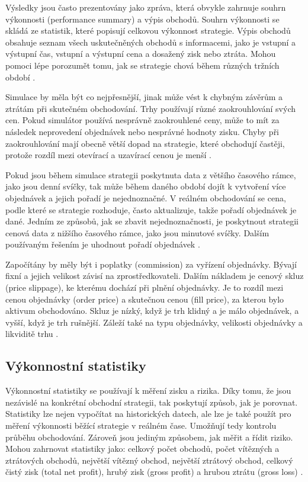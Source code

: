 Výsledky jsou často prezentovány jako zpráva, která obvykle zahrnuje souhrn výkonnosti (performance summary) a výpis obchodů.
Souhrn výkonnosti se skládá ze statistik, které popisují celkovou výkonnost strategie.
Výpis obchodů obsahuje seznam všech uskutečněných obchodů s informacemi, jako je vstupní a výstupní čas, vstupní a výstupní cena a dosažený zisk nebo ztráta.
Mohou pomoci lépe porozumět tomu, jak se strategie chová během různých tržních období \cite{pardo}.

Simulace by měla být co nejpřesnější, jinak může vést k chybným závěrům a ztrátám při skutečném obchodování.
Trhy používají různé zaokrouhlování svých cen. Pokud simulátor používá nesprávně zaokrouhlené ceny, může to mít za následek neprovedení objednávek nebo nesprávné hodnoty zisku.
Chyby při zaokrouhlování mají obecně větší dopad na strategie, které obchodují častěji, protože rozdíl mezi otevírací a uzavírací cenou je menší \cite{pardo}.

Pokud jsou během simulace strategii poskytnuta data z většího časového rámce, jako jsou denní svíčky, tak může během daného období dojít k vytvoření více objednávek a jejich pořadí je nejednoznačné.
V reálném obchodování se cena, podle které se strategie rozhoduje, často aktualizuje, takže pořadí objednávek je dané.
Jedním ze způsobů, jak se zbavit nejednoznačnosti, je poskytnout strategii cenová data z nižšího časového rámce, jako jsou minutové svíčky.
Dalším používaným řešením je uhodnout pořadí objednávek \cite{pardo}.

Započítány by měly být i poplatky (commission) za vyřízení objednávky.
Bývají fixní a jejich velikost závisí na zprostředkovateli.
Dalším nákladem je cenový skluz (price slippage), ke kterému dochází při plnění objednávky.
Je to rozdíl mezi cenou objednávky (order price) a skutečnou cenou (fill price), za kterou bylo aktivum obchodováno.
Skluz je nízký, když je trh klidný a je málo objednávek, a vyšší, když je trh rušnější.
Záleží také na typu objednávky, velikosti objednávky a likviditě trhu \cite{pardo}.

\subsection{Výkonnostní statistiky}
Výkonnostní statistiky se používají k měření zisku a rizika.
Díky tomu, že jsou nezávislé na konkrétní obchodní strategii, tak poskytují způsob, jak je porovnat.
Statistiky lze nejen vypočítat na historických datech, ale lze je také použít pro měření výkonnosti běžící strategie v reálném čase.
Umožňují tedy kontrolu průběhu obchodování.
Zároveň jsou jediným způsobem, jak měřit a řídit riziko.
Mohou zahrnovat statistiky jako: celkový počet obchodů, počet vítězných a ztrátových obchodů, největší vítězný obchod, největší ztrátový obchod, celkový čistý zisk (total net profit), hrubý zisk (gross profit) a hrubou ztrátu (gross loss) \cite{pardo}.

